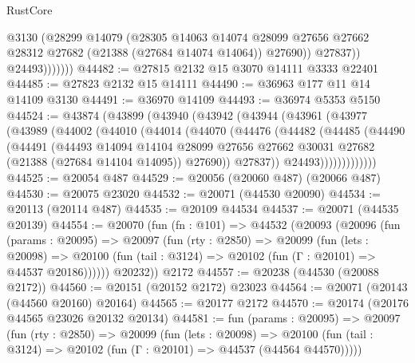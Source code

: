 \begin{lexlean}{RustCore}
\begin{coremodule}
                      @3130
                      (@28299
                        @14079
                        (@28305
                          @14063
                          @14074
                          @28099
                          @27656
                          @27662
                          @28312
                          @27682
                          (@21388 (@27684 @14074 @14064))
                          @27690))
                      @27837))
                  @24493)))))))
@44482 := @27815 @2132 @15 @3070 @14111 @3333 @22401
@44485 := @27823 @2132 @15 @14111
@44490 := @36963 @177 @11 @14 @14109 @3130
@44491 := @36970 @14109
@44493 := @36974 @5353 @5150
@44524 := @43874
    (@43899
      (@43940
        (@43942
          (@43944
            (@43961
              (@43977
                (@43989
                  (@44002
                    (@44010
                      (@44014
                        (@44070
                          (@44476
                            (@44482
                              (@44485
                                (@44490
                                  (@44491
                                    (@44493
                                      @14094
                                      @14104
                                      @28099
                                      @27656
                                      @27662
                                      @30031
                                      @27682
                                      (@21388 (@27684 @14104 @14095))
                                      @27690))
                                  @27837))
                              @24493)))))))))))))
@44525 := @20054 @487
@44529 := @20056 (@20060 @487) (@20066 @487)
@44530 := @20075 @23020
@44532 := @20071 (@44530 @20090)
@44534 := @20113 (@20114 @487)
@44535 := @20109 @44534
@44537 := @20071 (@44535 @20139)
@44554 := @20070
    (fun (fn : @101) =>
    @44532
      (@20093
        (@20096
          (fun (params : @20095) =>
          @20097
            (fun (rty : @2850) =>
            @20099
              (fun (lets : @20098) =>
              @20100 (fun (tail : @3124) => @20102 (fun (Γ : @20101) => @44537 @20186))))))
        @20232))
    @2172
@44557 := @20238 (@44530 (@20088 @2172))
@44560 := @20151 (@20152 @2172) @23023
@44564 := @20071 (@20143 (@44560 @20160) @20164)
@44565 := @20177 @2172
@44570 := @20174 (@20176 @44565 @23026 @20132 @20134)
@44581 := fun (params : @20095) =>
  @20097
    (fun (rty : @2850) =>
    @20099
      (fun (lets : @20098) =>
      @20100 (fun (tail : @3124) => @20102 (fun (Γ : @20101) => @44537 (@44564 @44570)))))

\end{coremodule}
\end{lexlean}
